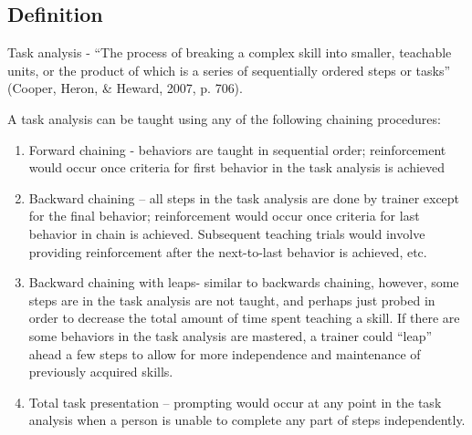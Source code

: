 \subsection{Definition}
Task analysis - ``The process of breaking a complex skill into smaller, teachable units, or the product of which is a series of sequentially ordered steps or tasks'' (Cooper, Heron, \& Heward, 2007, p. 706).

A task analysis can be taught using any of the following chaining procedures:
\begin{enumerate}
\item Forward chaining -  behaviors are taught in sequential order; reinforcement would occur once criteria for first behavior in the task analysis is achieved
\item Backward chaining – all steps in the task analysis are done by trainer except for the final behavior; reinforcement would occur once criteria for last behavior in chain is achieved.  Subsequent teaching trials would involve providing reinforcement after the next-to-last behavior is achieved, etc.
\item  Backward chaining with leaps- similar to backwards chaining, however, some steps are in the task analysis are not taught, and perhaps just probed in order to decrease the total amount of time spent teaching a skill.  If there are some behaviors in the task analysis are mastered, a trainer could ``leap'' ahead a few steps to allow for more independence and maintenance of previously acquired skills.
\item Total task presentation – prompting would occur at any point in the task analysis when a person is unable to complete any part of steps independently.
\end{enumerate}
%
